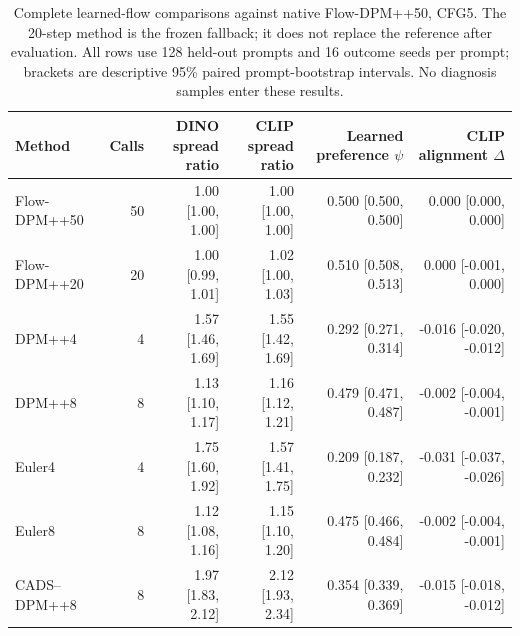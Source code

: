 \begin{table}[t]
\centering\footnotesize
\setlength{\tabcolsep}{3.5pt}
\begin{tabular}{lrrrrr}
\toprule
Method & Calls & \shortstack{DINO spread\\ratio} & \shortstack{CLIP spread\\ratio} & \shortstack{Learned preference\\$\psi$} & \shortstack{CLIP alignment\\$\Delta$} \\
\midrule
Flow-DPM++50 & 50 & 1.00 [1.00, 1.00] & 1.00 [1.00, 1.00] & 0.500 [0.500, 0.500] & 0.000 [0.000, 0.000] \\
Flow-DPM++20 & 20 & 1.00 [0.99, 1.01] & 1.02 [1.00, 1.03] & 0.510 [0.508, 0.513] & 0.000 [-0.001, 0.000] \\
DPM++4 & 4 & 1.57 [1.46, 1.69] & 1.55 [1.42, 1.69] & 0.292 [0.271, 0.314] & -0.016 [-0.020, -0.012] \\
DPM++8 & 8 & 1.13 [1.10, 1.17] & 1.16 [1.12, 1.21] & 0.479 [0.471, 0.487] & -0.002 [-0.004, -0.001] \\
Euler4 & 4 & 1.75 [1.60, 1.92] & 1.57 [1.41, 1.75] & 0.209 [0.187, 0.232] & -0.031 [-0.037, -0.026] \\
Euler8 & 8 & 1.12 [1.08, 1.16] & 1.15 [1.10, 1.20] & 0.475 [0.466, 0.484] & -0.002 [-0.004, -0.001] \\
CADS--DPM++8 & 8 & 1.97 [1.83, 2.12] & 2.12 [1.93, 2.34] & 0.354 [0.339, 0.369] & -0.015 [-0.018, -0.012] \\
\bottomrule
\end{tabular}
\caption{Complete learned-flow comparisons against native Flow-DPM++50, CFG5. The 20-step method is the frozen fallback; it does not replace the reference after evaluation. All rows use 128 held-out prompts and 16 outcome seeds per prompt; brackets are descriptive 95\% paired prompt-bootstrap intervals. No diagnosis samples enter these results.}
\label{tab:flow_all_outcomes}
\end{table}


